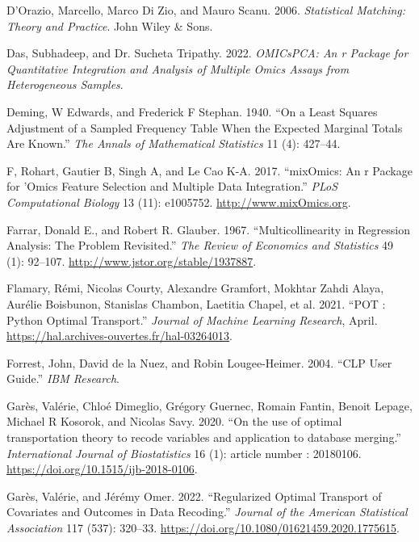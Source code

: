 \begin{CSLReferences}{1}{0}
\leavevmode{}%
D'Orazio, Marcello, Marco Di Zio, and Mauro Scanu. 2006. \emph{Statistical Matching: Theory and Practice}. John Wiley \& Sons.

\leavevmode{}%
Das, Subhadeep, and Dr. Sucheta Tripathy. 2022. \emph{OMICsPCA: An r Package for Quantitative Integration and Analysis of Multiple Omics Assays from Heterogeneous Samples}.

\leavevmode{}%
Deming, W Edwards, and Frederick F Stephan. 1940. {``On a Least Squares Adjustment of a Sampled Frequency Table When the Expected Marginal Totals Are Known.''} \emph{The Annals of Mathematical Statistics} 11 (4): 427--44.

\leavevmode{}%
F, Rohart, Gautier B, Singh A, and Le Cao K-A. 2017. {``mixOmics: An r Package for 'Omics Feature Selection and Multiple Data Integration.''} \emph{PLoS Computational Biology} 13 (11): e1005752. \url{http://www.mixOmics.org}.

\leavevmode{}%
Farrar, Donald E., and Robert R. Glauber. 1967. {``Multicollinearity in Regression Analysis: The Problem Revisited.''} \emph{The Review of Economics and Statistics} 49 (1): 92--107. \url{http://www.jstor.org/stable/1937887}.

\leavevmode{}%
Flamary, Rémi, Nicolas Courty, Alexandre Gramfort, Mokhtar Zahdi Alaya, Aurélie Boisbunon, Stanislas Chambon, Laetitia Chapel, et al. 2021. {``{POT : Python Optimal Transport}.''} \emph{{Journal of Machine Learning Research}}, April. \url{https://hal.archives-ouvertes.fr/hal-03264013}.

\leavevmode{}%
Forrest, John, David de la Nuez, and Robin Lougee-Heimer. 2004. {``CLP User Guide.''} \emph{IBM Research}.

\leavevmode{}%
Garès, Valérie, Chloé Dimeglio, Grégory Guernec, Romain Fantin, Benoit Lepage, Michael R Kosorok, and Nicolas Savy. 2020. {``{On the use of optimal transportation theory to recode variables and application to database merging}.''} \emph{{International Journal of Biostatistics}} 16 (1): article number : 20180106. \url{https://doi.org/10.1515/ijb-2018-0106}.

\leavevmode{}%
Garès, Valérie, and Jérémy Omer. 2022. {``Regularized Optimal Transport of Covariates and Outcomes in Data Recoding.''} \emph{Journal of the American Statistical Association} 117 (537): 320--33. \url{https://doi.org/10.1080/01621459.2020.1775615}.


\end{CSLReferences}
